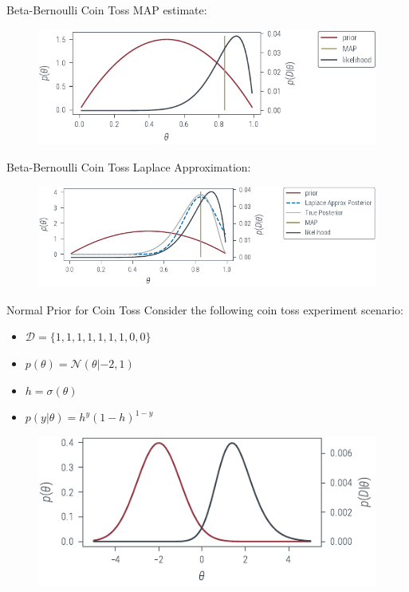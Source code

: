 \documentclass{beamer}
\begin{document}
\begin{frame}{Beta-Bernoulli Coin Toss}
    MAP estimate:
    \begin{figure}
        \includegraphics[]{../figures/laplace-approx/beta-prior-coin-toss-map.pdf}
    \end{figure}
\end{frame}

\begin{frame}{Beta-Bernoulli Coin Toss}
    Laplace Approximation:
    \begin{figure}
        \includegraphics[]{../figures/laplace-approx/beta-prior-coin-toss-laplace.pdf}
    \end{figure}
\end{frame}

\begin{frame}{Normal Prior for Coin Toss}
    Consider the following coin toss experiment scenario:
    \begin{itemize}
        \item $\mathcal{D} = \{1, 1, 1, 1, 1, 1, 1, 0, 0\}$
        \item $p(\theta) = \mathcal{N}(\theta|-2, 1)$
        \item $h = \sigma(\theta)$
        \item $p(y|\theta) = h^y(1-h)^{1-y}$
    \end{itemize}
    \begin{figure}
        \includegraphics[]{../figures/laplace-approx/normal-prior-coin-toss.pdf}
    \end{figure}
\end{frame}
\end{document}
